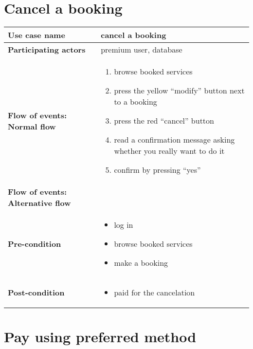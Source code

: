 \documentclass[a4paper, 13pt, draft]{report}
\begin{document}
\section*{Cancel a booking}

\begin{center}
	\begin{tabular}{| >{\bf}l | p{5.55cm} |} 
		\hline
		Use case name & cancel a booking \\ 
		\hline
		Participating actors & premium user, database \\
		\hline
		Flow of events: Normal flow & 
		\begin{enumerate}		
			\item browse booked services
			\item press the yellow ``modify'' button next to a booking
			\item press the red ``cancel'' button
			\item read a confirmation message asking whether you really want to do it
			\item confirm by pressing ``yes''
		\end{enumerate}	\\
		\hline
		Flow of events: Alternative flow & \notapplicable \\
		\hline
		Pre-condition & 
		\begin{itemize} 
			\item log in
			\item browse booked services
			\item make a booking
		\end{itemize} \\
		\hline
		Post-condition & 
		\begin{itemize} 
			\item paid for the cancelation
		\end{itemize} \\
		\hline
	\end{tabular}
\end{center}

\section*{Pay using preferred method}
\end{document}
